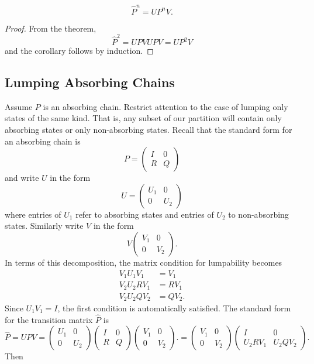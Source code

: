 \documentclass[12pt]{article}
\begin{document}
\begin{corollary}
    \[
        \hat{P}^n = U P^n V.
    \]
\end{corollary}

\begin{proof}
    From the theorem,
    \[
        \hat{P}^2 = U P V U P V = U P^2 V
    \] and the corollary follows by induction.
\end{proof}

\subsection*{Lumping Absorbing Chains}

Assume \( P \) is an absorbing chain.  Restrict attention to the case of
lumping only states of the same kind. That is, any subset of our
partition will contain only absorbing states or only non-absorbing
states.  Recall that the standard form for an absorbing chain is
\[
    P =
    \begin{pmatrix}
        I & 0 \\
        R & Q
    \end{pmatrix}
\] and write \( U \) in the form
\[
    U =
    \begin{pmatrix}
        U_1 & 0 \\
        0 & U_{2}
    \end{pmatrix}
\] where entries of \( U_1 \) refer to absorbing states and entries of \(
U_2 \) to non-absorbing states.  Similarly write \( V \) in the form
\[
    V
    \begin{pmatrix}
        V_1 & 0 \\
        0 & V_{2}
    \end{pmatrix}
    .
\] In terms of this decomposition, the matrix condition for lumpability
becomes
\begin{align*}
    V_1 U_1 V_1 &= V_1 \\
    V_2 U_2 R V_1 &= R V_1 \\
    V_2 U_2 Q V_2 &= Q V_2.
\end{align*}
Since \( U_1 V_1 = I \), the first condition is automatically satisfied.
The standard form for the transition matrix \( \hat{P} \) is
\[
    \hat{P} = UPV =
    \begin{pmatrix}
        U_1 & 0 \\
        0 & U_{2}
    \end{pmatrix}
    \begin{pmatrix}
        I & 0 \\
        R & Q
    \end{pmatrix}
    \begin{pmatrix}
        V_1 & 0 \\
        0 & V_{2}
    \end{pmatrix}
    . =
    \begin{pmatrix}
        V_1 & 0 \\
        0 & V_{2}
    \end{pmatrix}
    \begin{pmatrix}
        I & 0 \\
        U_2 R V_1 & U_2 Q V_2
    \end{pmatrix}
    .
\] Then
\end{document}
